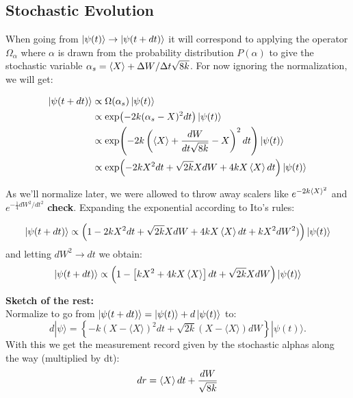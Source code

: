\subsection{Stochastic Evolution}
When going from $\ket{\psi(t)} \to \ket{\psi(t + dt)}$ it will correspond to applying the operator $\Omega_\alpha$ where $\alpha$ is drawn from the probability distribution $P(\alpha)$ to give the stochastic variable $\alpha_s =\expval{X} + {\Delta W}/{\Delta t \sqrt{8k}}$. For now ignoring the normalization, we will get:
\begin{fullwidth}
\begin{align}
    \ket{\psi(t + dt)}  &\propto \Omega(\alpha_s)\ket{\psi(t)} \\
                        &\propto \exp(-2k (\alpha_s - X)^2 dt ) \ket{\psi(t)} \\
                        &\propto \exp(-2k \left({\expval{X} + \frac{dW}{dt \sqrt{8k}}}  - X\right)^2 dt ) \ket{\psi(t)} \\
                        &\propto \exp(-2k X^2 dt + \sqrt{2k} X dW + 4 k X \expval{X} dt) \ket{\psi(t)}
\end{align}
\end{fullwidth}
As we'll normalize later, we were allowed to throw away scalers like $e^{-2k\expval{X}^2}$ and $e^{-\frac{1}{4}dW^2 / dt^2}$ \textbf{check}. Expanding the exponential according to Ito's rules:
\begin{fullwidth}
\begin{equation}
\ket{\psi(t + dt)} \propto    \left( 1 -2k X^2 dt + \sqrt{2k} X dW + 4 k X \expval{X} dt + k X^2 dW^2) \right)\ket{\psi(t)} 
\end{equation}
and letting $dW^2 \to dt$ we obtain:
\begin{equation}
\ket{\psi(t + dt)} \propto    \left( 1 - \left[k X^2 + 4 k X \expval{X} \right]dt + \sqrt{2k} X dW \right)\ket{\psi(t)}     
\end{equation}
\end{fullwidth}
\textbf{Sketch of the rest:} \\ 
\noindent
Normalize to go from $\ket{\psi(t + dt)} = \ket{\psi(t)} + d\ket{\psi(t)}$ to:
\begin{equation}
d|\psi\rangle=\left\{-k(X-\langle X\rangle)^2 d t+\sqrt{2 k}(X-\langle X\rangle) d W\right\}|\psi(t)\rangle .
\end{equation}
With this we get the measurement record given by the stochastic alphas along the way (multiplied by dt):
\begin{align}
    dr = \expval{X}dt + \frac{dW}{\sqrt{8k}}
\end{align}

